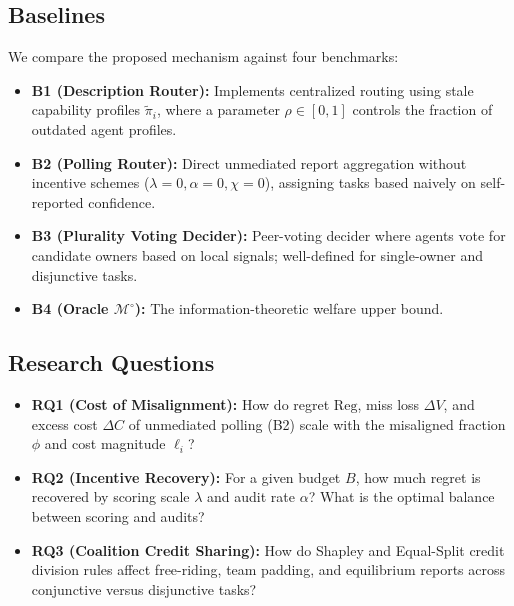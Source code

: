 \documentclass{article}
\theoremstyle{definition}
\begin{document}
\subsection{Baselines}
We compare the proposed mechanism against four benchmarks:
\begin{itemize}
    \item \textbf{B1 (Description Router):} Implements centralized routing using stale capability profiles $\tilde{\pi}_i$, where a parameter $\rho \in [0, 1]$ controls the fraction of outdated agent profiles.
    \item \textbf{B2 (Polling Router):} Direct unmediated report aggregation without incentive schemes ($\lambda = 0, \alpha = 0, \chi = 0$), assigning tasks based naively on self-reported confidence.
    \item \textbf{B3 (Plurality Voting Decider):} Peer-voting decider where agents vote for candidate owners based on local signals; well-defined for single-owner and disjunctive tasks.
    \item \textbf{B4 (Oracle $\mathcal{M}^\circ$):} The information-theoretic welfare upper bound.
\end{itemize}

\subsection{Research Questions}
\begin{itemize}
    \item \textbf{RQ1 (Cost of Misalignment):} How do regret $\mathrm{Reg}$, miss loss $\Delta V$, and excess cost $\Delta C$ of unmediated polling (B2) scale with the misaligned fraction $\phi$ and cost magnitude $\ell_i$?
    \item \textbf{RQ2 (Incentive Recovery):} For a given budget $B$, how much regret is recovered by scoring scale $\lambda$ and audit rate $\alpha$? What is the optimal balance between scoring and audits?
    \item \textbf{RQ3 (Coalition Credit Sharing):} How do Shapley and Equal-Split credit division rules affect free-riding, team padding, and equilibrium reports across conjunctive versus disjunctive tasks?
\end{itemize}
\end{document}
